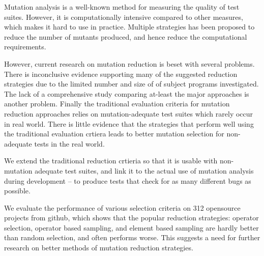 Mutation analysis is a well-known method for measuring the quality of
test suites. However, it is computationally intensive compared to
other measures, which makes it hard to use in practice. Multiple
strategies has been proposed to reduce the number of mutants produced,
and hence reduce the computational requirements.

%
However, current research on mutation reduction is beset with several
problems. There is inconclusive evidence supporting many of the suggested
reduction strategies due to the limited number and size of of subject
programs investigated. The lack of a comprehensive study comparing
at-least the major approaches is another problem. Finally the traditional
evaluation criteria for mutation reduction approaches relies on
mutation-adequate test suites which rarely occur in real world. There is
little evidence that the strategies that perform well using the traditional
evaluation crtiera leads to better mutation selection for non-adequate
tests in the real world.


We extend the traditional reduction crtieria so that it is usable with
non-mutation adequate test suites, and link it to the actual use of
mutation analysis during development -- to produce tests that check for
as many different bugs as possible.

We evaluate the performance of various selection criteria on 312 opensource
projects from github, which shows that the popular reduction strategies:
operator selection, operator based sampling, and element based sampling
are hardly better than random selection, and often performs worse.
This suggests a need for further research on better methods of mutation
reduction strategies.






